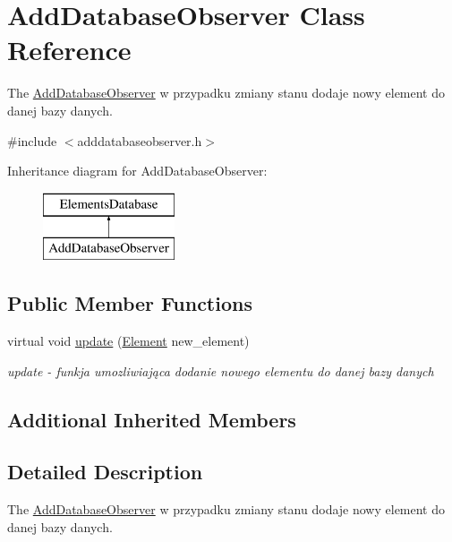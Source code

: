 \hypertarget{class_add_database_observer}{}\section{Add\+Database\+Observer Class Reference}
\label{class_add_database_observer}


The \mbox{\hyperlink{class_add_database_observer}{Add\+Database\+Observer}} w przypadku zmiany stanu dodaje nowy element do danej bazy danych.  




{\ttfamily \#include $<$adddatabaseobserver.\+h$>$}

Inheritance diagram for Add\+Database\+Observer\+:\begin{figure}[H]
\begin{center}
\leavevmode
\includegraphics[height=2.000000cm]{class_add_database_observer}
\end{center}
\end{figure}
\subsection*{Public Member Functions}
\begin{DoxyCompactItemize}
\item 
virtual void \mbox{\hyperlink{class_add_database_observer_a6f2bc1af6f2887b326c40d2efec9cf42}{update}} (\mbox{\hyperlink{class_element}{Element}} new\+\_\+element)
\begin{DoxyCompactList}\small\item\em update -\/ funkja umozliwiająca dodanie nowego elementu do danej bazy danych \end{DoxyCompactList}\end{DoxyCompactItemize}
\subsection*{Additional Inherited Members}


\subsection{Detailed Description}
The \mbox{\hyperlink{class_add_database_observer}{Add\+Database\+Observer}} w przypadku zmiany stanu dodaje nowy element do danej bazy danych. 

